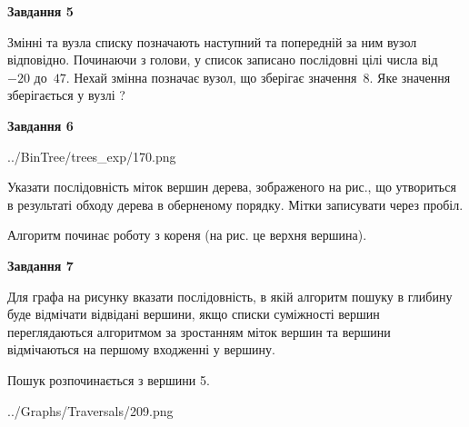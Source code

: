 \documentclass[12pt, ukrainian]{article}
\begin{document}
{\begin {large}
{\begin {center}\textbf{Завдання 5}\end {center}}\par
Змінні  та  вузла списку позначають наступний та попередній за ним вузол відповідно. Починаючи з голови, у список записано послідовні цілі числа від~$-20$ до~$47$. Нехай змінна  позначає вузол, що зберігає значення~$8$.
Яке значення зберігається у вузлі  ?\par
\newpage

{\begin {center}\textbf{Завдання 6}\end {center}}\par

\begin{center}
	{../BinTree/trees_exp/170.png}
\end{center}
Указати послідовність міток вершин дерева, зображеного на рис., що утвориться в результаті обходу дерева в оберненому порядку. Мітки записувати через пробіл.\par Алгоритм починає роботу з кореня (на рис. це верхня вершина).\par
\newpage

{\begin {center}\textbf{Завдання 7}\end {center}}\par
Для графа на рисунку вказати послідовність, в якій алгоритм пошуку в глибину буде відмічати відвідані вершини, якщо списки суміжності вершин переглядаються алгоритмом за зростанням міток вершин та вершини відмічаються на першому вход\-женні у вершину.\par
Пошук розпочинається з вершини 5.\par

\begin{center}
	{../Graphs/Traversals/209.png}
\end{center}\par
\newpage


\end{large}}
\end{document}
